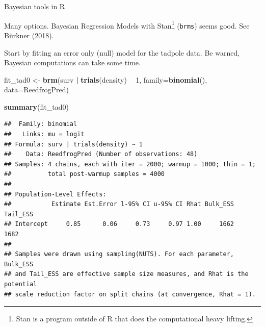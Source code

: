 \documentclass[
  ignorenonframetext,
]{beamer}
\newenvironment{Shaded}{\begin{snugshade}}{\end{snugshade}}
\newcommand{\DataTypeTok}[1]{\textcolor[rgb]{0.13,0.29,0.53}{#1}}
\newcommand{\DecValTok}[1]{\textcolor[rgb]{0.00,0.00,0.81}{#1}}
\newcommand{\KeywordTok}[1]{\textcolor[rgb]{0.13,0.29,0.53}{\textbf{#1}}}
\newcommand{\NormalTok}[1]{#1}
\newcommand{\OperatorTok}[1]{\textcolor[rgb]{0.81,0.36,0.00}{\textbf{#1}}}
\newcommand{\StringTok}[1]{\textcolor[rgb]{0.31,0.60,0.02}{#1}}
\begin{document}
\begin{frame}[fragile]{Bayesian tools in R}
\protect\hypertarget{bayesian-tools-in-r}{}

Many options. Bayesian Regression Models with
Stan\footnote{Stan is a program outside of R that does the computational heavy lifting.}
(\texttt{brms}) seems good. See Bürkner (2018).

Start by fitting an error only (null) model for the tadpole data. Be
warned, Bayesian computations can take some time.

\scriptsize

\begin{Shaded}
\begin{Highlighting}[]
\NormalTok{fit_tad0 <-}\StringTok{ }\KeywordTok{brm}\NormalTok{(surv }\OperatorTok{|}\StringTok{ }\KeywordTok{trials}\NormalTok{(density) }\OperatorTok{~}\StringTok{ }\DecValTok{1}\NormalTok{, }
               \DataTypeTok{family=}\KeywordTok{binomial}\NormalTok{(), }\DataTypeTok{data=}\NormalTok{ReedfrogPred)}
\end{Highlighting}
\end{Shaded}

\begin{Shaded}
\begin{Highlighting}[]
\KeywordTok{summary}\NormalTok{(fit_tad0)}
\end{Highlighting}
\end{Shaded}

\begin{verbatim}
##  Family: binomial 
##   Links: mu = logit 
## Formula: surv | trials(density) ~ 1 
##    Data: ReedfrogPred (Number of observations: 48) 
## Samples: 4 chains, each with iter = 2000; warmup = 1000; thin = 1;
##          total post-warmup samples = 4000
## 
## Population-Level Effects: 
##           Estimate Est.Error l-95% CI u-95% CI Rhat Bulk_ESS Tail_ESS
## Intercept     0.85      0.06     0.73     0.97 1.00     1662     1682
## 
## Samples were drawn using sampling(NUTS). For each parameter, Bulk_ESS
## and Tail_ESS are effective sample size measures, and Rhat is the potential
## scale reduction factor on split chains (at convergence, Rhat = 1).
\end{verbatim}

\end{frame}
\end{document}
